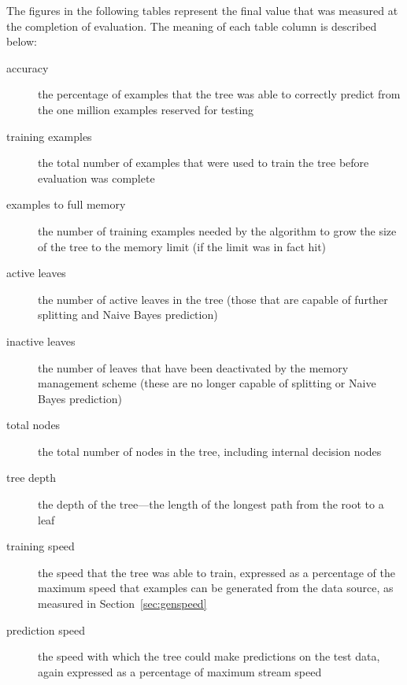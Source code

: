 The figures in the following tables represent the final value that was measured at the completion of evaluation.
The meaning of each table column is described below:

\begin{description}
\item[accuracy] the percentage of examples that the tree was able to correctly predict from the one million examples reserved for testing
\item[training examples] the total number of examples that were used to train the tree before evaluation was complete
\item[examples to full memory] the number of training examples needed by the algorithm to grow the size of the tree to the memory limit (if the limit was in fact hit)
\item[active leaves] the number of active leaves in the tree (those that are capable of further splitting and Naive Bayes prediction)
\item[inactive leaves] the number of leaves that have been deactivated by the memory management scheme (these are no longer capable of splitting or Naive Bayes prediction)
\item[total nodes] the total number of nodes in the tree, including internal decision nodes
\item[tree depth] the depth of the tree---the length of the longest path from the root to a leaf
\item[training speed] the speed that the tree was able to train, expressed as a percentage of the maximum speed that examples can be generated from the data source, as measured in Section~\ref{sec:genspeed}
\item[prediction speed] the speed with which the tree could make predictions on the test data, again expressed as a percentage of maximum stream speed
\end{description}
